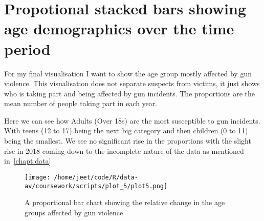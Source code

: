 \documentclass{report}
\begin{document}
\chapter{Propotional stacked bars showing age demographics over the time period}\label{chapt:plot5}
For my final visualisation I want to show the age group mostly affected by gun
violence. This visualisation does not separate suspects from victims, it just
shows who is taking part and being affected by gun incidents. The proportions
are the mean number of people taking part in each year.

Here we can see how Adults (Over 18s) are the most susceptible to gun
incidents. With teens (12 to 17) being the next big category and then children
(0 to 11) being the smallest. We see no significant rise
in the proportions with the slight rise in 2018 coming down to the incomplete
nature of the data as mentioned in~\ref{chapt:data}

\begin{figure}[htbp]
	\centerline{\texttt{[image: /home/jeet/code/R/data-av/coursework/scripts/plot\_5/plot5.png]}}
	\caption[]{\label{fig:plot5} A proportional bar chart showing the relative
		change in the age groups affected by gun violence}
\end{figure}


\printbibliography{}
\end{document}
